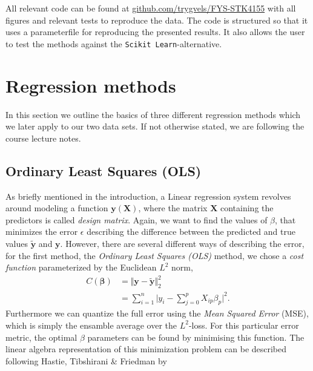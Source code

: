 \documentclass[a4paper, twocolumn]{article}
\begin{document}
All relevant code can be found at \href{https://github.com/trygvels/FYS-STK4155}{github.com/trygvels/FYS-STK4155} with all figures and relevant tests to reproduce the data. The code is structured so that it uses a parameterfile for reproducing the presented results. It also allows the user to test the methods against the \texttt{Scikit Learn}-alternative.

\section{Regression methods}
In this section we outline the basics of three different regression methods which we later apply to our two data sets. If not otherwise stated, we are following the course lecture notes\autocite{MHJ}. 
\subsection{Ordinary Least Squares (OLS)}
As briefly mentioned in the introduction, a Linear regression system revolves around modeling a function $\mathbf{y}(\mathbf{X})$, where the matrix $\mathbf{X}$ containing the predictors is called \textit{design matrix}. Again, we want to find the values of $\beta$, that minimizes the error $\epsilon$ describing the difference between the predicted and true values $\mathbf{\tilde{y}}$ and $\mathbf{y}$.
However, there are several different ways of describing the error, for the first method, the \textit{Ordinary Least Squares (OLS)} method, we chose a \textit{cost function} parameterized by the Euclidean $L^2$ norm,
\begin{align}
C(\bm\beta) &= \Vert \mathbf{y} - \tilde{\mathbf{y}}\Vert_2^2 \nonumber \\
&= \sum_{i=1}^n \Big| y_i - \sum_{j=0}^p X_{ip} \beta_p \Big|^2. \label{eq:cost}
\end{align}
Furthermore we can quantize the full error using the \textit{Mean Squared Error} (MSE), which is simply the ensamble average over the $L^2$-loss. 
For this particular error metric, the optimal $\beta$ parameters can be found by minimising this function.
The linear algebra representation of this minimization problem can be described following Hastie, Tibshirani \& Friedman\autocite{trevor2009elements} by
\end{document}
